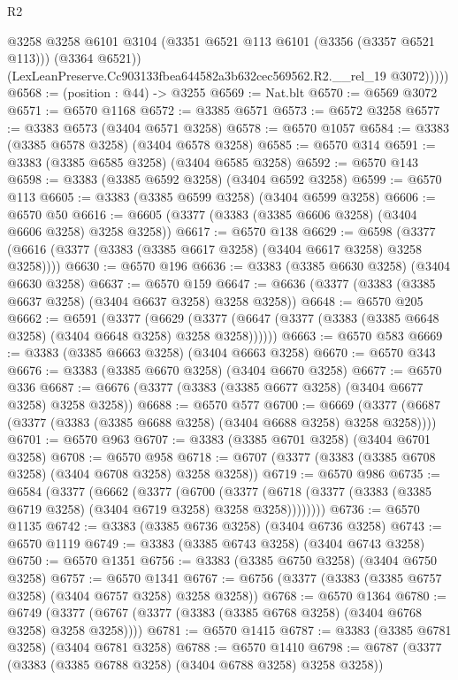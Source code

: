 \begin{lexlean}{R2}
\begin{coremodule}
              @3258
              @3258
              @6101
              @3104
              (@3351 @6521 @113 @6101 (@3356 (@3357 @6521 @113)))
              (@3364 @6521))
            (LexLeanPreserve.Cc903133fbea644582a3b632cec569562.R2.__rel_19 @3072)))))
@6568 := (position : @44) -> @3255
@6569 := Nat.blt
@6570 := @6569 @3072
@6571 := @6570 @1168
@6572 := @3385 @6571
@6573 := @6572 @3258
@6577 := @3383 @6573 (@3404 @6571 @3258)
@6578 := @6570 @1057
@6584 := @3383 (@3385 @6578 @3258) (@3404 @6578 @3258)
@6585 := @6570 @314
@6591 := @3383 (@3385 @6585 @3258) (@3404 @6585 @3258)
@6592 := @6570 @143
@6598 := @3383 (@3385 @6592 @3258) (@3404 @6592 @3258)
@6599 := @6570 @113
@6605 := @3383 (@3385 @6599 @3258) (@3404 @6599 @3258)
@6606 := @6570 @50
@6616 := @6605 (@3377 (@3383 (@3385 @6606 @3258) (@3404 @6606 @3258) @3258 @3258))
@6617 := @6570 @138
@6629 := @6598 (@3377 (@6616 (@3377 (@3383 (@3385 @6617 @3258) (@3404 @6617 @3258) @3258 @3258))))
@6630 := @6570 @196
@6636 := @3383 (@3385 @6630 @3258) (@3404 @6630 @3258)
@6637 := @6570 @159
@6647 := @6636 (@3377 (@3383 (@3385 @6637 @3258) (@3404 @6637 @3258) @3258 @3258))
@6648 := @6570 @205
@6662 := @6591
    (@3377
      (@6629 (@3377 (@6647 (@3377 (@3383 (@3385 @6648 @3258) (@3404 @6648 @3258) @3258 @3258))))))
@6663 := @6570 @583
@6669 := @3383 (@3385 @6663 @3258) (@3404 @6663 @3258)
@6670 := @6570 @343
@6676 := @3383 (@3385 @6670 @3258) (@3404 @6670 @3258)
@6677 := @6570 @336
@6687 := @6676 (@3377 (@3383 (@3385 @6677 @3258) (@3404 @6677 @3258) @3258 @3258))
@6688 := @6570 @577
@6700 := @6669 (@3377 (@6687 (@3377 (@3383 (@3385 @6688 @3258) (@3404 @6688 @3258) @3258 @3258))))
@6701 := @6570 @963
@6707 := @3383 (@3385 @6701 @3258) (@3404 @6701 @3258)
@6708 := @6570 @958
@6718 := @6707 (@3377 (@3383 (@3385 @6708 @3258) (@3404 @6708 @3258) @3258 @3258))
@6719 := @6570 @986
@6735 := @6584
    (@3377
      (@6662
        (@3377
          (@6700
            (@3377 (@6718 (@3377 (@3383 (@3385 @6719 @3258) (@3404 @6719 @3258) @3258 @3258))))))))
@6736 := @6570 @1135
@6742 := @3383 (@3385 @6736 @3258) (@3404 @6736 @3258)
@6743 := @6570 @1119
@6749 := @3383 (@3385 @6743 @3258) (@3404 @6743 @3258)
@6750 := @6570 @1351
@6756 := @3383 (@3385 @6750 @3258) (@3404 @6750 @3258)
@6757 := @6570 @1341
@6767 := @6756 (@3377 (@3383 (@3385 @6757 @3258) (@3404 @6757 @3258) @3258 @3258))
@6768 := @6570 @1364
@6780 := @6749 (@3377 (@6767 (@3377 (@3383 (@3385 @6768 @3258) (@3404 @6768 @3258) @3258 @3258))))
@6781 := @6570 @1415
@6787 := @3383 (@3385 @6781 @3258) (@3404 @6781 @3258)
@6788 := @6570 @1410
@6798 := @6787 (@3377 (@3383 (@3385 @6788 @3258) (@3404 @6788 @3258) @3258 @3258))

\end{coremodule}
\end{lexlean}
